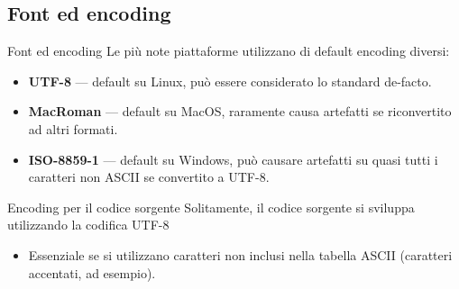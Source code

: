 \documentclass[presentation]{beamer}
\begin{document}
\subsection{Font ed encoding}

\begin{frame}{Font ed encoding}
	Le più note piattaforme utilizzano di default encoding diversi:
	\begin{itemize}
		\item \textbf{UTF-8} --- default su Linux, può essere considerato lo standard de-facto.
		\item \textbf{MacRoman} --- default su MacOS, raramente causa artefatti se riconvertito ad altri formati.
		\item \textbf{ISO-8859-1} --- default su Windows, può causare artefatti su quasi tutti i caratteri non ASCII se convertito a UTF-8.
	\end{itemize}
	\begin{block}{Encoding per il codice sorgente}
		Solitamente, il codice sorgente si sviluppa utilizzando la codifica UTF-8
		\begin{itemize}
			\item Essenziale se si utilizzano caratteri non inclusi nella tabella ASCII (caratteri accentati, ad esempio).
		\end{itemize}
	\end{block}
\end{frame}
\end{document}
